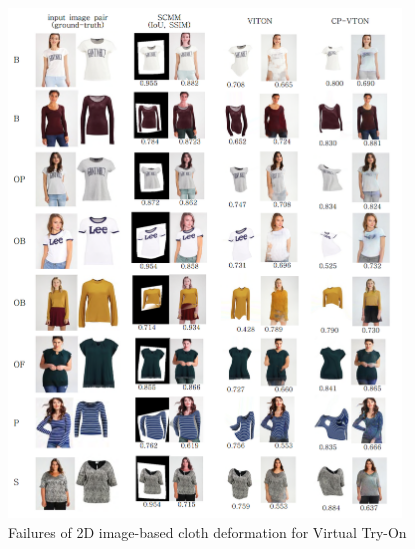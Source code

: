 \begin{figure}[t]
\centering
\includegraphics[height=13.5cm, scale=1]{figures/2dvton_same.png}   %
\caption{Failures of 2D image-based cloth deformation for Virtual Try-On}
\label{fig:classified2DVTONresult}
\end{figure}





